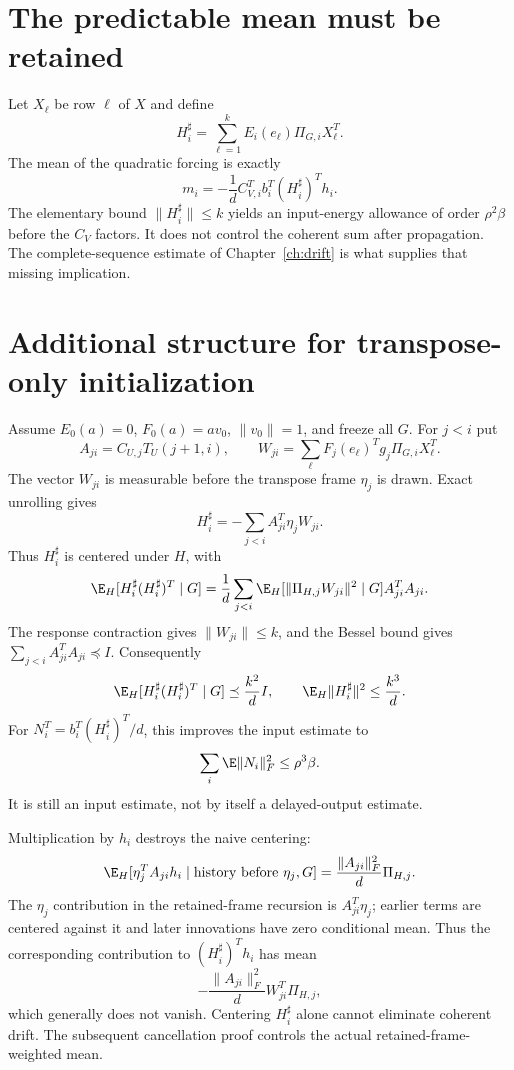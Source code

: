 \documentclass[11pt,oneside,openany,a4paper]{book}
\numberwithin{equation}{chapter}
\theoremstyle{definition}
\theoremstyle{remark}
\begin{document}
\section{The predictable mean must be retained}
Let $X_\ell$ be row $\ell$ of $X$ and define
\[
 H_i^\sharp=\sum_{\ell=1}^{k}E_i(e_\ell)\Pi_{G,i}X_\ell^T.
\]
The mean of the quadratic forcing is exactly
\[
 m_i=-\frac1d C_{V,i}^Tb_i^T(H_i^\sharp)^Th_i.
\]
The elementary bound $\|H_i^\sharp\|\le k$ yields an input-energy allowance of order $\rho^2\beta$ before the $C_V$ factors. It does not control the coherent sum after propagation. The complete-sequence estimate of Chapter~\ref{ch:drift} is what supplies that missing implication.

\section{Additional structure for transpose-only initialization}
Assume $E_0(a)=0$, $F_0(a)=av_0$, $\|v_0\|=1$, and freeze all $G$. For $j<i$ put
\[
 A_{ji}=C_{U,j}T_U(j+1,i),\qquad
 W_{ji}=\sum_\ell F_j(e_\ell)^Tg_j\Pi_{G,i}X_\ell^T.
\]
The vector $W_{ji}$ is measurable before the transpose frame $\eta_j$ is drawn. Exact unrolling gives
\[
 H_i^\sharp=-\sum_{j<i}A_{ji}^T\eta_jW_{ji}.
\]
Thus $H_i^\sharp$ is centered under $H$, with
\[
 \E_H[H_i^\sharp(H_i^\sharp)^T\mid G]
 =\frac1d\sum_{j<i}\E_H[\|\Pi_{H,j}W_{ji}\|^2\mid G]A_{ji}^TA_{ji}.
\]
The response contraction gives $\|W_{ji}\|\le k$, and the Bessel bound gives $\sum_{j<i}A_{ji}^TA_{ji}\preceq I$. Consequently
\[
 \E_H[H_i^\sharp(H_i^\sharp)^T\mid G]\preceq\frac{k^2}{d}I,
 \qquad \E_H\|H_i^\sharp\|^2\le\frac{k^3}{d}.
\]
For $N_i^T=b_i^T(H_i^\sharp)^T/d$, this improves the input estimate to
\[
 \sum_i\E\|N_i\|_F^2\le\rho^3\beta.
\]
It is still an input estimate, not by itself a delayed-output estimate.

Multiplication by $h_i$ destroys the naive centering:
\[
 \E_H[\eta_j^TA_{ji}h_i\mid\text{history before }\eta_j,G]
 =\frac{\|A_{ji}\|_F^2}{d}\Pi_{H,j}.
\]
The $\eta_j$ contribution in the retained-frame recursion is $A_{ji}^T\eta_j$; earlier terms are centered against it and later innovations have zero conditional mean. Thus the corresponding contribution to $(H_i^\sharp)^Th_i$ has mean
\[
 -\frac{\|A_{ji}\|_F^2}{d}W_{ji}^T\Pi_{H,j},
\]
which generally does not vanish. Centering $H_i^\sharp$ alone cannot eliminate coherent drift. The subsequent cancellation proof controls the actual retained-frame-weighted mean.

\endgroup
\end{document}
